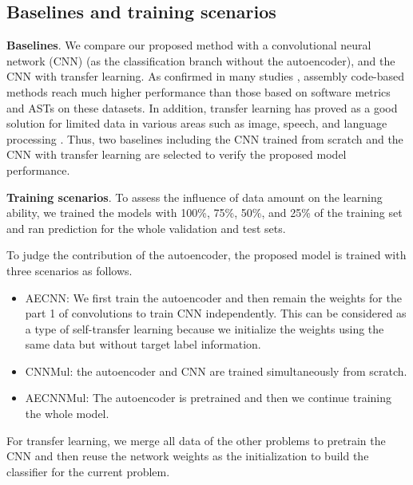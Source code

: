 \subsection{Baselines and training scenarios}
\textbf{Baselines}. We compare our proposed method with a convolutional neural network (CNN) (as the classification branch without the autoencoder), and the CNN with transfer learning. As confirmed in many studies \cite{phan2017convolutional,phan2018dgcnn, phan2017conv_asm}, assembly code-based methods reach much higher performance than those based on software metrics and ASTs on these datasets. In addition, transfer learning has proved as a good solution for limited data in various areas such as image, speech, and language processing \cite{weiss2016survey}. Thus, two baselines including the CNN trained from scratch and the CNN with transfer learning are selected to verify the proposed model performance.

\textbf{Training scenarios}. To assess the influence of data amount on the learning ability, we trained the models with 100\%, 75\%, 50\%, and 25\% of the training set and ran prediction for the whole validation and test sets.

To judge the contribution of the autoencoder, the proposed model is trained with three scenarios as follows.
\begin{itemize}
    \item AE\-CNN: We first train the autoencoder and then remain the weights for the part 1 of convolutions to train CNN independently. This can be considered as a type of self-transfer learning because we initialize the weights using the same data but without target label information.
    \item CNN\-Mul: the autoencoder and CNN are trained simultaneously from scratch.
    \item AE\-CNN\-Mul: The autoencoder is pretrained and then we continue training the whole model. 
\end{itemize}

For transfer learning, we merge all data of the other problems to pretrain the CNN and then reuse the network weights as the initialization to build the classifier for the current problem.  
